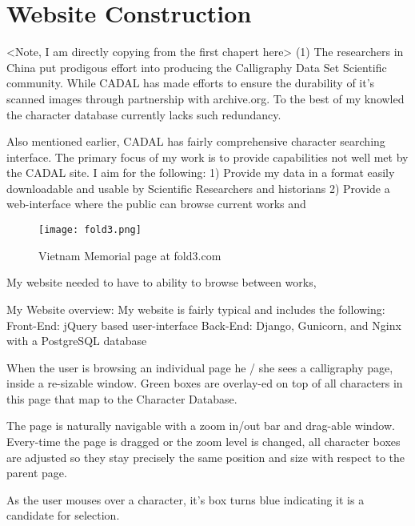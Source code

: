\chapter{Website Construction}

    <Note, I am directly copying from the first chapert here>
    (1)  The researchers in China put prodigous effort into producing the Calligraphy Data Set Scientific community.  While CADAL has made efforts to ensure the durability of it's scanned images through partnership with archive.org.  To the best of my knowled the character database currently lacks such redundancy.
    
    Also mentioned earlier, CADAL has fairly comprehensive character searching interface.  The primary focus of my work is to provide capabilities not well met by the CADAL site.  I aim for the following:
    1)  Provide my data in a format easily downloadable and usable by Scientific Researchers and historians
    2)  Provide a web-interface where the public can browse current works and
    
    
    
    
    \begin{figure}{}
    \parbox{12cm}{\texttt{[image: fold3.png]}}
    \caption{Vietnam Memorial page at fold3.com}
    \label{Vietnam Memorial inspiration}
    \end{figure}
    
    My website needed to have to ability to browse between works, 
    
        My Website overview:
            My website is fairly typical and includes the following:
                Front-End:  jQuery based user-interface
                Back-End:   Django, Gunicorn, and Nginx with a PostgreSQL database
                
            When the user is browsing an individual page he / she sees a calligraphy page, inside a re-sizable window.
                Green boxes are overlay-ed on top of all characters in this page that map to the Character Database.
                
                The page is naturally navigable with a zoom in/out bar and drag-able window.
                Every-time the page is dragged or the zoom level is changed, all character boxes are adjusted so they stay precisely the same position and size with respect to the parent page.
                
                As the user mouses over a character, it's box turns blue indicating it is a candidate for selection.
                
